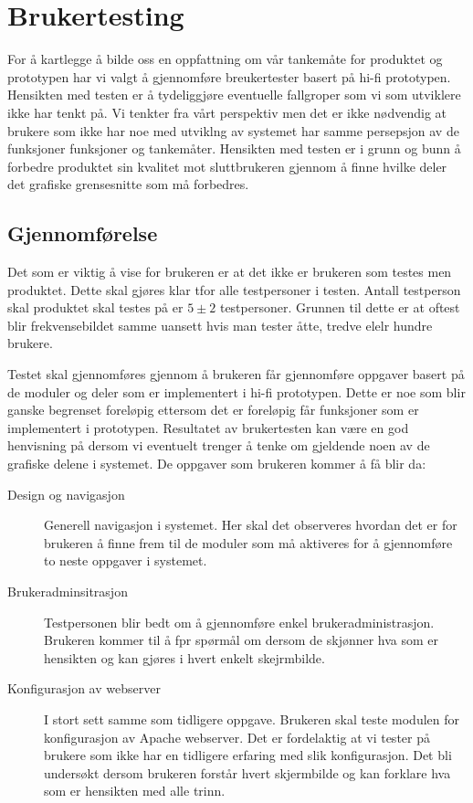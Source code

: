 \chapter{Brukertesting}
\lettrine[lines=2]{F}{}or å kartlegge å bilde oss en oppfattning om vår tankemåte for produktet og prototypen har vi valgt å gjennomføre breukertester basert på hi-fi prototypen. Hensikten med testen er å tydeliggjøre eventuelle fallgroper som vi som utviklere ikke har tenkt på. Vi tenkter fra vårt perspektiv men det er ikke nødvendig at brukere som ikke har noe med utviklng av systemet har samme persepsjon av de funksjoner funksjoner og tankemåter. 
Hensikten med testen er i grunn og bunn å forbedre produktet sin kvalitet mot sluttbrukeren gjennom å finne hvilke deler det grafiske grensesnitte som må forbedres. 

\section{Gjennomførelse}
Det som er viktig å vise for brukeren er at det ikke er brukeren som testes men produktet. Dette skal gjøres klar tfor alle testpersoner i testen. Antall testperson skal produktet skal testes på er $5 \pm 2$ testpersoner. Grunnen til dette er at oftest blir frekvensebildet samme uansett hvis man tester åtte, tredve elelr hundre brukere.\cite{lazar2010research}

Testet skal gjennomføres gjennom å brukeren får gjennomføre oppgaver basert på de moduler og deler som er implementert i hi-fi prototypen. Dette er noe som blir ganske begrenset foreløpig ettersom det er foreløpig får funksjoner som er implementert i prototypen. Resultatet av brukertesten kan være en god henvisning på dersom  vi eventuelt trenger å tenke om gjeldende noen av de grafiske delene i systemet. 
De oppgaver som brukeren kommer å få blir da:
\begin{description}
\item[Design og navigasjon]
Generell navigasjon i systemet. Her skal det observeres hvordan det er for brukeren å finne frem til de moduler som må aktiveres for å gjennomføre to neste oppgaver i systemet.
\item[Brukeradminsitrasjon]
Testpersonen blir bedt om å gjennomføre enkel brukeradministrasjon. Brukeren kommer til å fpr spørmål om dersom de skjønner hva som er hensikten og kan gjøres i hvert enkelt skejrmbilde.
\item[Konfigurasjon av webserver]
I stort sett samme som tidligere oppgave. Brukeren skal teste modulen for konfigurasjon av Apache webserver. Det er fordelaktig at vi tester på brukere som ikke har en tidligere erfaring med slik konfigurasjon. Det bli undersøkt dersom brukeren forstår hvert skjermbilde og kan forklare hva som er hensikten med alle trinn.
\end{description}

